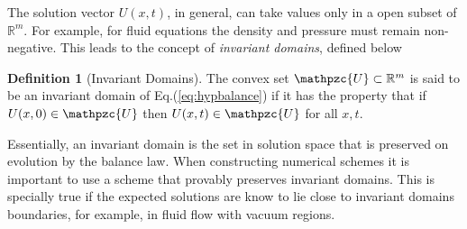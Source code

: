 \documentclass[11pt, reqno]{amsart}
\newcommand{\eqr}[1]{Eq.\thinspace(#1)}
\newcommand{\script}[1]{\mathpzc{#1}}
\theoremstyle{definition}
\newtheorem{dfn}{Definition}
\begin{document}
The solution vector $U(x,t)$, in general, can take values only in a
open subset of $\mathbb{R}^m$. For example, for fluid equations the
density and pressure must remain non-negative. This leads to the
concept of \emph{invariant domains}, defined below
\begin{dfn}[Invariant Domains]
  The convex set $\script{U} \subset \mathbb{R}^m$ is said to be an
  invariant domain of \eqr{\ref{eq:hypbalance}} if it has the property
  that if $U(x,0) \in \script{U}$ then $U(x,t) \in \script{U}$ for all
  $x,t$.
\end{dfn}

Essentially, an invariant domain is the set in solution space that is
preserved on evolution by the balance law. When constructing numerical
schemes it is important to use a scheme that provably preserves
invariant domains. This is specially true if the expected solutions
are know to lie close to invariant domains boundaries, for example, in
fluid flow with vacuum regions.
\end{document}

